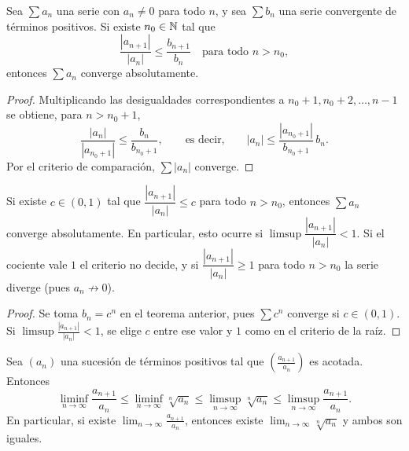 \begin{theorem}
  Sea \(\sum a_n\) una serie con \(a_n \neq 0\) para todo \(n\), y sea \(\sum b_n\) una serie convergente de términos positivos. Si existe \(n_0 \in \mathbb{N}\) tal que
  \[
    \frac{|a_{n+1}|}{|a_n|} \leq \frac{b_{n+1}}{b_n} \quad \text{para todo } n > n_0,
  \]
  entonces \(\sum a_n\) converge absolutamente.
\end{theorem}

\begin{proof}
  Multiplicando las desigualdades correspondientes a \(n_0 + 1, n_0 + 2, \dots, n - 1\) se obtiene, para \(n > n_0 + 1\),
  \[
    \frac{|a_n|}{|a_{n_0 + 1}|} \leq \frac{b_n}{b_{n_0 + 1}}, \qquad \text{es decir,} \qquad |a_n| \leq \frac{|a_{n_0 + 1}|}{b_{n_0 + 1}} \, b_n.
  \]
  Por el criterio de comparación, \(\sum |a_n|\) converge.
\end{proof}

\begin{corollary}
  Si existe \(c \in (0, 1)\) tal que \(\dfrac{|a_{n+1}|}{|a_n|} \leq c\) para todo \(n > n_0\), entonces \(\sum a_n\) converge absolutamente. En particular, esto ocurre si \(\limsup \dfrac{|a_{n+1}|}{|a_n|} < 1\). Si el cociente vale \(1\) el criterio no decide, y si \(\dfrac{|a_{n+1}|}{|a_n|} \geq 1\) para todo \(n > n_0\) la serie diverge (pues \(a_n \not\to 0\)).
\end{corollary}

\begin{proof}
  Se toma \(b_n = c^n\) en el teorema anterior, pues \(\sum c^n\) converge si \(c \in (0, 1)\). Si \(\limsup \frac{|a_{n+1}|}{|a_n|} < 1\), se elige \(c\) entre ese valor y \(1\) como en el criterio de la raíz.
\end{proof}

\begin{theorem}
  Sea \({(a_n)}\) una sucesión de términos positivos tal que \({\left( \frac{a_{n+1}}{a_n} \right)}\) es acotada. Entonces
  \[
    \liminf_{n \to \infty} \frac{a_{n+1}}{a_n} \leq \liminf_{n \to \infty} \sqrt[n]{a_n} \leq \limsup_{n \to \infty} \sqrt[n]{a_n} \leq \limsup_{n \to \infty} \frac{a_{n+1}}{a_n}.
  \]
  En particular, si existe \(\lim_{n \to \infty} \frac{a_{n+1}}{a_n}\), entonces existe \(\lim_{n \to \infty} \sqrt[n]{a_n}\) y ambos son iguales.
\end{theorem}

